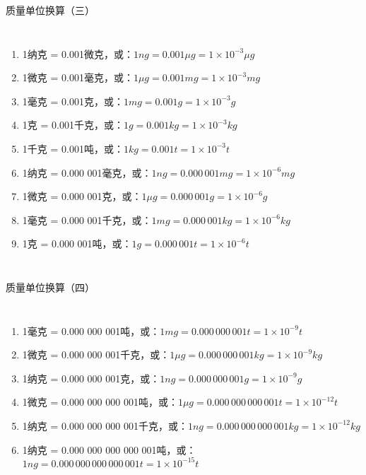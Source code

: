 \documentclass[aspectratio=169]{ctexbeamer} %
\begin{document}
\begin{frame}[t]{质量单位换算（三）}
\begin{columns}
\begin{enumerate}[label={\Alph*.}]
\item 1纳克 = 0.001微克，或：$1 ng = 0.001 \mu g = 1 \times 10^{-3} \mu g$ \pause
\item 1微克 = 0.001毫克，或：$1 \mu g = 0.001 mg = 1 \times 10^{-3} mg$ \pause
\item 1毫克 = 0.001克，或：$1 mg = 0.001 g = 1 \times 10^{-3} g$ \pause
\item 1克 = 0.001千克，或：$1 g = 0.001 kg = 1 \times 10^{-3} kg$ \pause
\item 1千克 = 0.001吨，或：$1 kg = 0.001 t = 1 \times 10^{-3} t$ \pause
\item 1纳克 = 0.000 001毫克，或：$1 ng = 0.000 \, 001 mg = 1 \times 10^{-6} mg$ \pause
\item 1微克 = 0.000 001克，或：$1 \mu g = 0.000 \, 001 g = 1 \times 10^{-6} g$ \pause
\item 1毫克 = 0.000 001千克，或：$1 mg = 0.000 \, 001 kg = 1 \times 10^{-6} kg$ \pause
\item 1克 = 0.000 001吨，或：$1 g = 0.000 \, 001 t = 1 \times 10^{-6} t$ \pause
\pause
\end{enumerate}
\end{columns}
\end{frame}

\begin{frame}[t]{质量单位换算（四）}
\begin{columns}
\begin{enumerate}[label={\Alph*.}]
\item 1毫克 = 0.000 000 001吨，或：$1 mg = 0.000 \, 000 \, 001 t = 1 \times 10^{-9} t$ \pause
\item 1微克 = 0.000 000 001千克，或：$1 \mu g = 0.000 \, 000 \, 001 kg = 1 \times 10^{-9} kg$ \pause
\item 1纳克 = 0.000 000 001克，或：$1 ng = 0.000 \, 000 \, 001 g = 1 \times 10^{-9} g$ \pause
\item 1微克 = 0.000 000 000 001吨，或：$1 \mu g = 0.000 \, 000 \, 000 \, 001 t = 1 \times 10^{-12} t$ \pause
\item 1纳克 = 0.000 000 000 001千克，或：$1 ng = 0.000 \, 000 \, 000 \, 001 kg = 1 \times 10^{-12} kg$ \pause
\item 1纳克 = 0.000 000 000 000 001吨，或：$1 ng = 0.000 \, 000 \, 000 \, 000 \, 001 t = 1 \times 10^{-15} t$ \pause
\pause
\end{enumerate}
\end{columns}
\end{frame}
\end{document}
